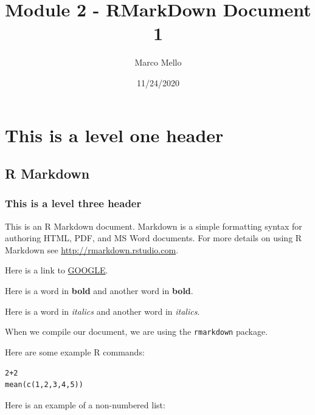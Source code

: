 \documentclass[
]{article}
\title{Module 2 - RMarkDown Document 1}
\author{Marco Mello}
\date{11/24/2020}
\begin{document}
\maketitle

\hypertarget{this-is-a-level-one-header}{%
\section{This is a level one header}\label{this-is-a-level-one-header}}

\hypertarget{r-markdown}{%
\subsection{R Markdown}\label{r-markdown}}

\hypertarget{this-is-a-level-three-header}{%
\subsubsection{This is a level three
header}\label{this-is-a-level-three-header}}

This is an R Markdown document. Markdown is a simple formatting syntax
for authoring HTML, PDF, and MS Word documents. For more details on
using R Markdown see \url{http://rmarkdown.rstudio.com}.

Here is a link to \href{http://google.com}{GOOGLE}.

Here is a word in \textbf{bold} and another word in \textbf{bold}.

Here is a word in \emph{italics} and another word in \emph{italics}.

When we compile our document, we are using the \texttt{rmarkdown}
package.

Here are some example R commands:

\begin{verbatim}
2+2
mean(c(1,2,3,4,5))
\end{verbatim}

Here is an example of a non-numbered list:
\end{document}
